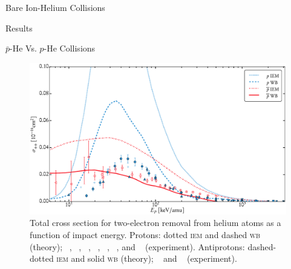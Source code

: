\documentclass[a5paper, 9 pt]{extreport}
\begin{document}
\begin{chapter}{Bare Ion-Helium Collisions \label{chap:p-he2p-he}}
\begin{section}{Results \label{sec:phe2p-res}}
\begin{subsection}{ \texorpdfstring{$\bar{p}$}{pbar}-He Vs. \texorpdfstring{$p$}{p}-He Collisions
                         \label{sec:pbarhe-res}}
         \begin{figure}[t]
            \centering
            \includegraphics[width = 0.95 \linewidth]{./images/pbarhe/pbarhe-++.eps}
            \caption[Total cross section for two-electron removal from helium atoms as a function of
                     impact energy]
                    {Total cross section for two-electron removal from helium atoms as a function
                     of impact energy. Protons: dotted \textsc{iem} and dashed \textsc{wb} (theory);
                     {\color{blue}{$\blacktriangle$}}~\cite{DTR84}, {\color{blue}{$+$}}~\cite{Sol62},
                     {\color{blue}{$\bullet$}}~\cite{SG89},
                     {\color{blue}{$\blacklozenge$}}~\cite{SG85},
                    {\color{blue}{$\blacktriangleright$}}~\cite{PM70},
                    {\color{blue}{$\blacktriangledown$}}~\cite{Wex64}, and
                    {\color{blue}{$\blacksquare$}}~\cite{KAH84} (experiment).
                    Antiprotons: dashed-dotted \textsc{iem} and solid \textsc{wb} (theory);
                    {\color{red}{$\circ$}}~\cite{HKM94} and {\color{red}{$\triangleleft$}}~\cite{KKT09}
                       (experiment). \label{fig:he++}}
         \end{figure}


\end{subsection}
\end{section}
\end{chapter}
\end{document}
